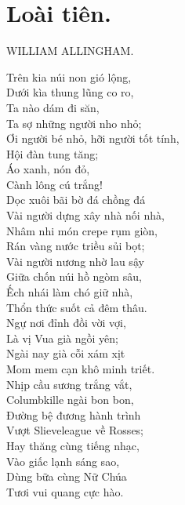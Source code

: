 \section{Loài tiên.}

\begin{large}
  \begin{center}
    \uppercase{William Allingham.}
  \end{center}
\end{large}

\noindent
Trên kia núi non gió lộng,\\
\indent
Dưới kìa thung lũng co ro,\\
Ta nào dám đi săn,\\
\indent
Ta sợ những người nho nhỏ;\\
Ơi người bé nhỏ, hỡi người tốt tính,\\
\indent
Hội đàn tung tăng;\\
Áo xanh, nón đỏ,\\
\indent
Cành lông cú trắng!\\
Dọc xuôi bãi bờ đá chồng đá\\
\indent
Vài người dựng xây nhà nối nhà,\\
Nhâm nhi món crepe rụm giòn,\\
\indent
Rán vàng nước triều sủi bọt;\\
Vài người nương nhờ lau sậy\\
\indent
Giữa chốn núi hồ ngòm sâu,\\
Ếch nhái làm chó giữ nhà,\\
\indent
Thổn thức suốt cả đêm thâu.\\

\noindent
Ngự nơi đỉnh đồi vời vợi,\\
\indent
Là vị Vua già ngồi yên;\\
Ngài nay già cỗi xám xịt\\
\indent
Mom mem cạn khô minh triết.\\
Nhịp cầu sương trắng vắt,\\
\indent
Columbkille ngài bon bon,\\
Đường bệ đương hành trình\\
\indent
Vượt Slieveleague về Rosses;\\
Hay thăng cùng tiếng nhạc,\\
\indent
Vào giấc lạnh sáng sao,\\
Dùng bữa cùng Nữ Chúa\\
\indent
Tươi vui quang cực hào.\\


